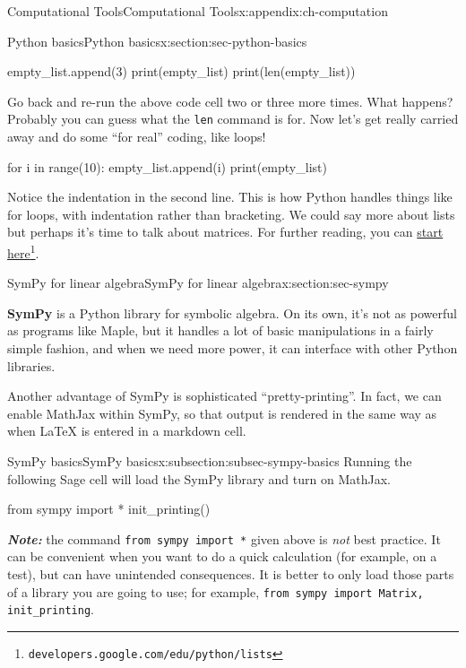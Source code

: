 \documentclass[oneside,10pt,]{book}
\newcommand{\mono}[1]{\texttt{#1}}
\newcommand{\alert}[1]{\textbf{\textit{#1}}}
\newcommand{\terminology}[1]{\textbf{#1}}
\numberwithin{equation}{section}
\begin{document}
\begin{appendixptx}{Computational Tools}{}{Computational Tools}{}{}{x:appendix:ch-computation}
\begin{sectionptx}{Python basics}{}{Python basics}{}{}{x:section:sec-python-basics}
\begin{sageinput}
empty_list.append(3)
print(empty_list)
print(len(empty_list))
\end{sageinput}
Go back and re-run the above code cell two or three more times. What happens? Probably you can guess what the \mono{len} command is for. Now let's get really carried away and do some ``for real'' coding, like loops!%
\begin{sageinput}
for i in range(10):
    empty_list.append(i)
print(empty_list)
\end{sageinput}
Notice the indentation in the second line. This is how Python handles things like for loops, with indentation rather than bracketing. We could say more about lists but perhaps it's time to talk about matrices. For further reading, you can \href{https://developers.google.com/edu/python/lists}{start here}\footnote{\nolinkurl{developers.google.com/edu/python/lists}\label{g:fn:idp141}}.%
\end{sectionptx}
%
%
\typeout{************************************************}
\typeout{************************************************}
%
\begin{sectionptx}{SymPy for linear algebra}{}{SymPy for linear algebra}{}{}{x:section:sec-sympy}
\begin{introduction}{}%
\terminology{SymPy} is a Python library for symbolic algebra. On its own, it's not as powerful as programs like Maple, but it handles a lot of basic manipulations in a fairly simple fashion, and when we need more power, it can interface with other Python libraries.%
\par
Another advantage of SymPy is sophisticated ``pretty-printing''. In fact, we can enable MathJax within SymPy, so that output is rendered in the same way as when LaTeX is entered in a markdown cell.%
\end{introduction}%
%
%
\typeout{************************************************}
\typeout{************************************************}
%
\begin{subsectionptx}{SymPy basics}{}{SymPy basics}{}{}{x:subsection:subsec-sympy-basics}
Running the following Sage cell will load the SymPy library and turn on MathJax.%
\begin{sageinput}
from sympy import *
init_printing()
\end{sageinput}
\alert{Note:} the command \mono{from sympy import *} given above is \emph{not} best practice. It can be convenient when you want to do a quick calculation (for example, on a test), but can have unintended consequences. It is better to only load those parts of a library you are going to use; for example, \mono{from sympy import Matrix, init\_printing}.%

\end{subsectionptx}
\end{sectionptx}
\end{appendixptx}
\end{document}
